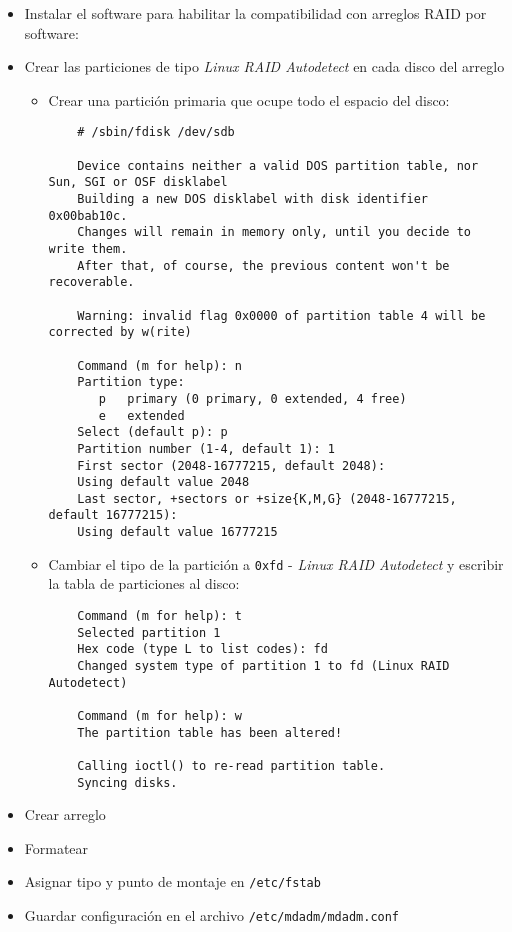 \begin{itemize}
  \item Instalar el software para habilitar la compatibilidad con arreglos \textsc{RAID} por software:
  \item Crear las particiones de tipo \textit{Linux RAID Autodetect} en cada disco del arreglo
    \begin{itemize}
      \item Crear una partici\'{o}n primaria que ocupe todo el espacio del disco:

{
\scriptsize
\linespread{1}
\begin{verbatim}
    # /sbin/fdisk /dev/sdb

    Device contains neither a valid DOS partition table, nor Sun, SGI or OSF disklabel
    Building a new DOS disklabel with disk identifier 0x00bab10c.
    Changes will remain in memory only, until you decide to write them.
    After that, of course, the previous content won't be recoverable.

    Warning: invalid flag 0x0000 of partition table 4 will be corrected by w(rite)

    Command (m for help): n
    Partition type:
       p   primary (0 primary, 0 extended, 4 free)
       e   extended
    Select (default p): p
    Partition number (1-4, default 1): 1
    First sector (2048-16777215, default 2048):
    Using default value 2048
    Last sector, +sectors or +size{K,M,G} (2048-16777215, default 16777215):
    Using default value 16777215
\end{verbatim}
}

      \item Cambiar el tipo de la partici\'{o}n a \texttt{0xfd} - \textit{Linux RAID Autodetect} y escribir la tabla de particiones al disco:

{
\scriptsize
\linespread{1}
\begin{verbatim}
    Command (m for help): t
    Selected partition 1
    Hex code (type L to list codes): fd
    Changed system type of partition 1 to fd (Linux RAID Autodetect)

    Command (m for help): w
    The partition table has been altered!

    Calling ioctl() to re-read partition table.
    Syncing disks.
\end{verbatim}
}

    \end{itemize}
  \item Crear arreglo
  \item Formatear
  \item Asignar tipo y punto de montaje en \texttt{/etc/fstab}
  \item Guardar configuraci\'{o}n en el archivo \texttt{/etc/mdadm/mdadm.conf}
\end{itemize}

